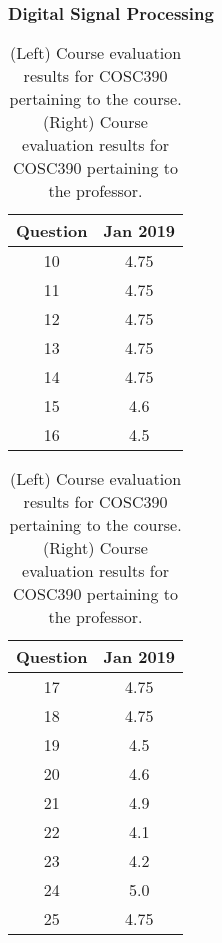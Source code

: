 \documentclass[../../main.tex]{subfiles}
\begin{document}
\subsubsection{Digital Signal Processing}

\begin{table}
\footnotesize
\centering
\begin{tabular}{| c | c |}
\hline
\hline
Question & Jan 2019 \\ \hline
10 & 4.75 \\ \hline
11 & 4.75 \\ \hline
12 & 4.75 \\ \hline
13 & 4.75 \\ \hline
14 & 4.75 \\ \hline
15 & 4.6 \\ \hline
16 & 4.5 \\ \hline
\hline
\end{tabular}
\begin{tabular}{| c | c |}
\hline
\hline
Question & Jan 2019 \\ \hline
17 & 4.75 \\ \hline
18 & 4.75 \\ \hline
19 & 4.5 \\ \hline
20 & 4.6 \\ \hline
21 & 4.9 \\ \hline
22 & 4.1 \\ \hline
23 & 4.2 \\ \hline
24 & 5.0 \\ \hline
25 & 4.75 \\ \hline
\hline
\end{tabular}
\caption{\label{tab:eval_dsp} (Left) Course evaluation results for COSC390 pertaining to the course.  (Right) Course evaluation results for COSC390 pertaining to the professor.}
\end{table}
\end{document}

